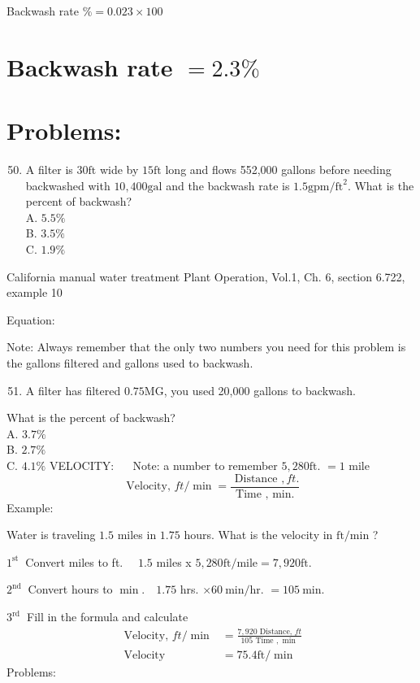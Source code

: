 \documentclass[10pt]{article}
\begin{document}
Backwash rate $\%=0.023 \times 100$

\section{Backwash rate $=2.3 \%$}
\section{Problems:}
\begin{enumerate}
  \setcounter{enumi}{49}
  \item A filter is $30 \mathrm{ft}$ wide by $15 \mathrm{ft}$ long and flows 552,000 gallons before needing backwashed with $10,400 \mathrm{gal}$ and the backwash rate is $1.5 \mathrm{gpm} / \mathrm{ft}^{2}$. What is the percent of backwash?\\
A. $5.5 \%$\\
B. $3.5 \%$\\
C. $1.9 \%$
\end{enumerate}
California manual water treatment Plant Operation, Vol.1, Ch. 6, section 6.722, example 10

Equation:

Note: Always remember that the only two numbers you need for this problem is the gallons filtered and gallons used to backwash.

\begin{enumerate}
  \setcounter{enumi}{50}
  \item A filter has filtered $0.75 \mathrm{MG}$, you used 20,000 gallons to backwash.
\end{enumerate}
What is the percent of backwash?\\
A. $3.7 \%$\\
B. $2.7 \%$\\
C. $4.1 \%$ VELOCITY: $\quad$ Note: a number to remember $5,280 \mathrm{ft}$. $=1$ mile
$$
\text { Velocity, } f t / \min =\frac{\text { Distance }, f t .}{\text { Time }, \text { min. }}
$$
Example:

Water is traveling $1.5$ miles in $1.75$ hours. What is the velocity in $\mathrm{ft} / \mathrm{min}$ ?

$1^{\text {st }}$ Convert miles to ft. $\quad 1.5$ miles x $5,280 \mathrm{ft} / \mathrm{mile}=7,920 \mathrm{ft}$.

$2^{\text {nd }}$ Convert hours to $\min . \quad 1.75$ hrs. $\times 60 \mathrm{~min} / \mathrm{hr}$. $=105 \mathrm{~min} .$

$3^{\text {rd }}$ Fill in the formula and calculate
$$
\begin{aligned}
\text { Velocity, } f t / \min &=\frac{7,920 \text { Distance, } f t}{105 \text { Time }, \text { min }} \\
\text { Velocity } &=75.4 \mathrm{ft} / \min
\end{aligned}
$$
Problems:
\end{document}
